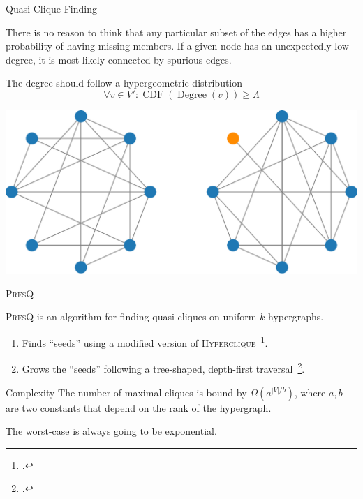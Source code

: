\documentclass[10pt]{beamer}
\newcommand{\PresQ}[0]{\textsc{PresQ}\xspace}
\begin{document}
\begin{frame}{Quasi-Clique Finding}
    \begin{block}{}
    There is no reason to think that any particular subset of the edges
    has a higher probability of having missing members. If a given node has an
    unexpectedly low degree, it is most likely connected by spurious edges.
    \end{block}
    \begin{block}{The degree should follow a hypergeometric distribution}
    \begin{equation}
        \forall v \in V': \operatorname{CDF}(\operatorname{Degree}(v)) \ge \Lambda
    \end{equation}
    \end{block}
    \centering
    \includegraphics[width=0.6\linewidth]{quasicliques}

\end{frame}

\begin{frame}{\PresQ}

    \begin{block}{}
    \PresQ is an algorithm for finding quasi-cliques on uniform
    $k$-hypergraphs.
    
    \begin{enumerate}
        \item Finds ``seeds'' using a modified version of \textsc{Hyperclique}~\footcite{koeller2003discovery}.
        \item Grows the ``seeds'' following a tree-shaped, depth-first
        traversal~\footcite{uno_efficient_2010}.
    \end{enumerate}
    \end{block}
    
    \begin{alertblock}{Complexity}
        \smallskip
        The number of maximal cliques is bound by $\Omega(a^{|V|/b})$,
        where $a, b$ are two constants that depend on the rank of the hypergraph.
        
        The worst-case is always going to be exponential.
    \end{alertblock}

\end{frame}
\end{document}
